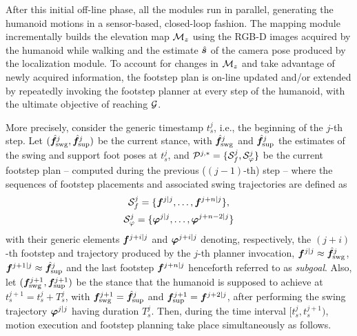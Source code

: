 After this initial off-line phase, all the modules run in parallel, generating the humanoid motions in a sensor-based, closed-loop fashion.
%
The mapping module incrementally builds the elevation map ${\cal M}_z$ using the RGB-D images acquired by the humanoid while walking and the estimate $\hat{{\bm{s}}}$ of the camera pose produced by the localization module.
To account for changes in ${\cal M}_z$ and take advantage of newly acquired information, the footstep plan is on-line updated and/or extended by repeatedly invoking the footstep planner at every step of the humanoid, with the ultimate objective of reaching $\cal G$. 

More precisely, consider the generic timestamp $t_s^j$, i.e., the beginning of the $j$-th step.
Let $(\hat{{\bm{f}}}_{\rm swg}^{j}, \hat{{\bm{f}}}_{\rm sup}^{j})$ be the current stance, with $\hat{{\bm{f}}}_{\rm swg}^{j}$ and $\hat{{\bm{f}}}_{\rm sup}^{j}$ the estimates of the swing and support foot poses at $t_s^j$, and ${\cal P}^{j,*} = \{ {\cal S}_f^{j}, {\cal S}_\varphi^{j} \}$ be the current footstep plan -- computed during the previous ($(j-1)$-th) step -- where the sequences of footstep placements and associated swing trajectories are defined as
\begin{gather*}
    {\cal S}_f^j = \{{\bm{f}}^{j|j}, \dots, {\bm{f}}^{j+n|j}\}, \\
    {\cal S}_\varphi^j = \{{\bm{\varphi}}^{j|j}, \dots, {\bm{\varphi}}^{j+n-2|j}\}
\end{gather*}
with their generic elements ${\bm{f}}^{j+i|j}$ and ${\bm{\varphi}}^{j+i|j}$ denoting, respectively, the $(j+i)$-th footstep and trajectory produced by the $j$-th planner invocation, ${\bm{f}}^{j|j} \approx \hat{{\bm{f}}}_{\rm swg}^{j}$, ${\bm{f}}^{j+1|j} \approx \hat{{\bm{f}}}_{\rm sup}^{j}$ and the last footstep ${\bm{f}}^{j+n|j}$ henceforth referred to as \textit{subgoal}.
Also, let $({\bm{f}}_{\rm swg}^{j+1}, {\bm{f}}_{\rm sup}^{j+1})$ be the stance that the humanoid is supposed to achieve at $t_s^{j+1} = t_s^j + T_s^j$, with ${\bm{f}}_{\rm swg}^{j+1} = \hat{{\bm{f}}}_{\rm sup}^{j}$ and ${\bm{f}}_{\rm sup}^{j+1} = {\bm{f}}^{j+2|j}$, after performing the swing trajectory ${\bm{\varphi}}^{j|j}$ having duration $T_s^j$.
%
Then, during the time interval $[t_s^j, t_s^{j+1})$, motion execution and footstep planning take place simultaneously as follows.
